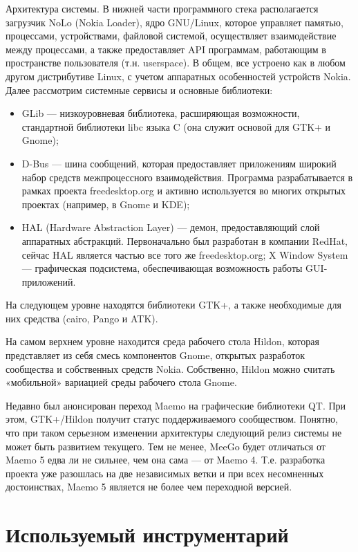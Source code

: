 Архитектура системы. В нижней части программного стека располагается загрузчик NoLo (Nokia Loader), ядро GNU/Linux, которое управляет памятью, процессами, устройствами, файловой системой, осуществляет взаимодействие между процессами, а также предоставляет API программам, работающим в пространстве пользователя (т.н. userspace). В общем, все устроено как в любом другом дистрибутиве Linux, с учетом аппаратных особенностей устройств Nokia. Далее рассмотрим системные сервисы и основные библиотеки:
\begin{itemize}
\item
GLib — низкоуровневая библиотека, расширяющая возможности, стандартной библиотеки libc языка C (она служит основой для GTK+ и Gnome);
\item
D-Bus — шина сообщений, которая предоставляет приложениям широкий набор средств межпроцессного взаимодействия. Программа разрабатывается в рамках проекта freedesktop.org и активно используется во многих открытых проектах (например, в Gnome и KDE);
\item
HAL (Hardware Abstraction Layer) — демон, предоставляющий слой аппаратных абстракций. Первоначально был разработан в компании RedHat, сейчас HAL является частью все того же freedesktop.org;
X Window System — графическая подсистема, обеспечивающая возможность работы GUI-приложений.
\end{itemize}
 
На следующем уровне находятся библиотеки GTK+, а также необходимые для них средства (cairo, Pango и ATK).

На самом верхнем уровне находится среда рабочего стола Hildon, которая представляет из себя смесь компонентов Gnome, открытых разработок сообщества и собственных средств Nokia. Собственно, Hildon можно считать «мобильной» вариацией среды рабочего стола Gnome.

Недавно был анонсирован переход Maemo на графические библиотеки QT. При этом, GTK+/Hildon получит статус поддерживаемого сообществом. Понятно, что при таком серьезном изменении архитектуры следующий релиз системы не может быть развитием текущего. Тем не менее, MeeGo будет отличаться от Maemo 5 едва ли не сильнее, чем она сама — от Maemo 4. Т.е. разработка проекта уже разошлась на две независимых ветки и при всех несомненных достоинствах, Maemo 5 является не более чем переходной версией.

\section{Используемый инструментарий}\label{sec:choose_toolkit}

